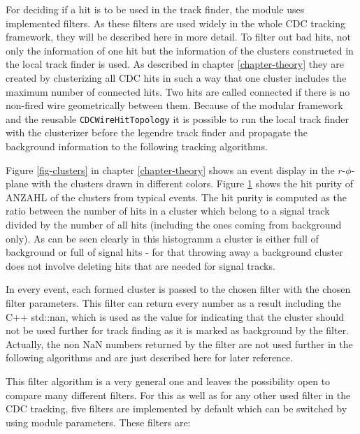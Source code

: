 For deciding if a hit is to be used in the track finder, the module uses implemented filters. As these filters are used widely in the whole CDC tracking framework, they will be described here in more detail. To filter out bad hits, not only the information of one hit but the information of the clusters constructed in the local track finder is used. As described in chapter \ref{chapter-theory} they are created by clusterizing all CDC hits in such a way that one cluster includes the maximum number of connected hits. Two hits are called connected if there is no non-fired wire geometrically between them. Because of the modular framework and the reusable \texttt{CDCWireHitTopology} it is possible to run the local track finder with the clusterizer before the legendre track finder and propagate the background information to the following tracking algorithms. 

Figure \ref{fig-clusters} in chapter \ref{chapter-theory} shows an event display in the $r$-$\phi$-plane with the clusters drawn in different colors. Figure \ref{fig-cluster-hit-purity} shows the hit purity of ANZAHL of the clusters from typical events. The hit purity is computed as the ratio between the number of hits in a cluster which belong to a signal track divided by the number of all hits (including the ones coming from background only). As can be seen clearly in this histogramm a cluster is either full of background or full of signal hits - for that throwing away a background cluster does not involve deleting hits that are needed for signal tracks.

\begin{figure}
  \caption{}
  \label{fig-cluster-hit-purity}
\end{figure}


In every event, each formed cluster is passed to the chosen filter with the chosen filter parameters. This filter can return every number as a result including the C++ std::nan, which is used as the value for indicating that the cluster should not be used further for track finding as it is marked as background by the filter. Actually, the non NaN numbers returned by the filter are not used further in the following algorithms and are just described here for later reference. 

This filter algorithm is a very general one and leaves the possibility open to compare many different filters. For this as well as for any other used filter in the CDC tracking, five filters are implemented by default which can be switched by using module parameters. These filters are:

